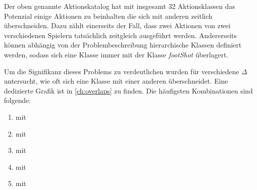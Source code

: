Der oben genannte Aktionskatalog hat mit insgesamt 32 Aktionsklassen das Potenzial einige Aktionen zu beinhalten die sich mit anderen zeitlich überschneiden.
Dazu zählt einerseits der Fall, dass zwei Aktionen von zwei verschiedenen Spielern tatsächlich zeitgleich ausgeführt werden.
Andererseits können abhängig von der Problembeschreibung \zB hierarchische Klassen definiert werden, sodass sich eine Klasse  immer mit der Klasse \emph{footShot} überlagert.

Um die Signifikanz dieses Problems zu verdeutlichen wurden für verschiedene $\Delta$ untersucht, wie oft sich eine Klasse mit einer anderen überschneidet.
Eine dedizierte Grafik ist in \autoref{ch:overlaps} zu finden.
Die häufigsten Kombinationen sind folgende:

\begin{enumerate}
    \item {} mit 
    \item {} mit 
    \item {} mit 
    \item {} mit 
    \item {} mit 
\end{enumerate}

